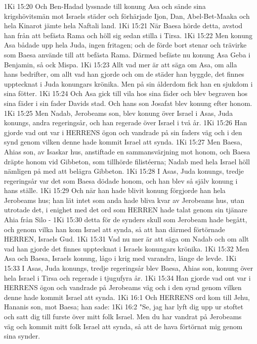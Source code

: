 1Ki 15:20  Och Ben-Hadad lyssnade till konung Asa och sände sina krigshövitsmän mot Israels städer och förhärjade Ijon, Dan, Abel-Bet-Maaka och hela Kinarot jämte hela Naftali land.
1Ki 15:21  När Baesa hörde detta, avstod han från att befästa Rama och höll sig sedan stilla i Tirsa.
1Ki 15:22  Men konung Asa bådade upp hela Juda, ingen fritagen; och de förde bort stenar och trävirke som Baesa använde till att befästa Rama. Därmed befäste nu konung Asa Geba i Benjamin, så ock Mispa.
1Ki 15:23  Allt vad mer är att säga om Asa, om alla hans bedrifter, om allt vad han gjorde och om de städer han byggde, det finnes upptecknat i Juda konungars krönika. Men på sin ålderdom fick han en sjukdom i sina fötter.
1Ki 15:24  Och Asa gick till vila hos sina fäder och blev begraven hos sina fäder i sin fader Davids stad. Och hans son Josafat blev konung efter honom.
1Ki 15:25  Men Nadab, Jerobeams son, blev konung över Israel i Asas, Juda konungs, andra regeringsår, och han regerade över Israel i två år.
1Ki 15:26  Han gjorde vad ont var i HERRENS ögon och vandrade på sin faders väg och i den synd genom vilken denne hade kommit Israel att synda.
1Ki 15:27  Men Baesa, Ahias son, av Isaskar hus, anstiftade en sammansvärjning mot honom, och Baesa dräpte honom vid Gibbeton, som tillhörde filistéerna; Nadab med hela Israel höll nämligen på med att belägra Gibbeton.
1Ki 15:28  I Asas, Juda konungs, tredje regeringsår var det som Baesa dödade honom, och han blev så själv konung i hans ställe.
1Ki 15:29  Och när han hade blivit konung förgjorde han hela Jerobeams hus; han lät intet som anda hade bliva kvar av Jerobeams hus, utan utrotade det, i enighet med det ord som HERREN hade talat genom sin tjänare Ahia från Silo -
1Ki 15:30  detta för de synders skull som Jerobeam hade begått, och genom vilka han kom Israel att synda, så att han därmed förtörnade HERREN, Israels Gud.
1Ki 15:31  Vad nu mer är att säga om Nadab och om allt vad han gjorde det finnes upptecknat i Israels konungars krönika.
1Ki 15:32  Men Asa och Baesa, Israels konung, lågo i krig med varandra, länge de levde.
1Ki 15:33  I Asas, Juda konungs, tredje regeringsår blev Baesa, Ahias son, konung över hela Israel i Tirsa och regerade i tjugufyra år.
1Ki 15:34  Han gjorde vad ont var i HERRENS ögon och vandrade på Jerobeams väg och i den synd genom vilken denne hade kommit Israel att synda.
1Ki 16:1  Och HERRENS ord kom till Jehu, Hananis son, mot Baesa; han sade:
1Ki 16:2  "Se, jag har lyft dig upp ur stoftet och satt dig till furste över mitt folk Israel. Men du har vandrat på Jerobeams väg och kommit mitt folk Israel att synda, så att de hava förtörnat mig genom sina synder.
